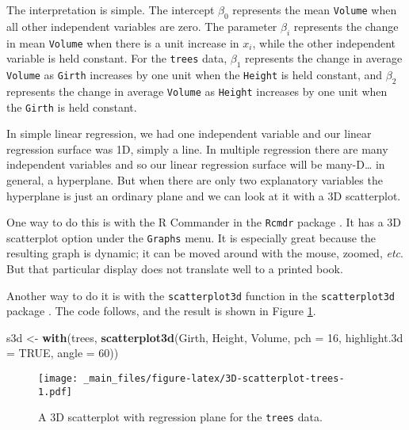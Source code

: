 \documentclass[]{book}
\newenvironment{Shaded}{\begin{snugshade}}{\end{snugshade}}
\newcommand{\KeywordTok}[1]{\textcolor[rgb]{0.13,0.29,0.53}{\textbf{{#1}}}}
\newcommand{\DataTypeTok}[1]{\textcolor[rgb]{0.13,0.29,0.53}{{#1}}}
\newcommand{\DecValTok}[1]{\textcolor[rgb]{0.00,0.00,0.81}{{#1}}}
\newcommand{\StringTok}[1]{\textcolor[rgb]{0.31,0.60,0.02}{{#1}}}
\newcommand{\OtherTok}[1]{\textcolor[rgb]{0.56,0.35,0.01}{{#1}}}
\newcommand{\NormalTok}[1]{{#1}}
\numberwithin{equation}{chapter}
\numberwithin{figure}{chapter}
\theoremstyle{plain}
\theoremstyle{definition}
\theoremstyle{remark}
\theoremstyle{definition}
\theoremstyle{definition}
\theoremstyle{remark}
\begin{document}
The interpretation is simple. The intercept \(\beta_{0}\) represents the
mean \texttt{Volume} when all other independent variables are zero. The
parameter \(\beta_{i}\) represents the change in mean \texttt{Volume}
when there is a unit increase in \(x_{i}\), while the other independent
variable is held constant. For the \texttt{trees} data, \(\beta_{1}\)
represents the change in average \texttt{Volume} as \texttt{Girth}
increases by one unit when the \texttt{Height} is held constant, and
\(\beta_{2}\) represents the change in average \texttt{Volume} as
\texttt{Height} increases by one unit when the \texttt{Girth} is held
constant.

In simple linear regression, we had one independent variable and our
linear regression surface was 1D, simply a line. In multiple regression
there are many independent variables and so our linear regression
surface will be many-D\ldots{} in general, a hyperplane. But when there
are only two explanatory variables the hyperplane is just an ordinary
plane and we can look at it with a 3D scatterplot.

One way to do this is with the R Commander in the \texttt{Rcmdr} package
\autocite{Rcmdr}. It has a 3D scatterplot option under the
\texttt{Graphs} menu. It is especially great because the resulting graph
is dynamic; it can be moved around with the mouse, zoomed, \emph{etc}.
But that particular display does not translate well to a printed book.

Another way to do it is with the \texttt{scatterplot3d} function in the
\texttt{scatterplot3d} package \autocite{scatterplot3d}. The code
follows, and the result is shown in Figure
\ref{fig:3D-scatterplot-trees}.

\begin{Shaded}
\begin{Highlighting}[]
\NormalTok{s3d <-}\StringTok{ }\KeywordTok{with}\NormalTok{(trees, }\KeywordTok{scatterplot3d}\NormalTok{(Girth, Height, Volume, }\DataTypeTok{pch =} \DecValTok{16}\NormalTok{, }
                                 \DataTypeTok{highlight.3d =} \OtherTok{TRUE}\NormalTok{, }\DataTypeTok{angle =} \DecValTok{60}\NormalTok{))}
\end{Highlighting}
\end{Shaded}

\begin{figure}[htbp]
\centering
\texttt{[image: \_main\_files/figure-latex/3D-scatterplot-trees-1.pdf]}
\caption{\label{fig:3D-scatterplot-trees}\small A 3D scatterplot with regression
plane for the \texttt{trees} data.}
\end{figure}
\end{document}
